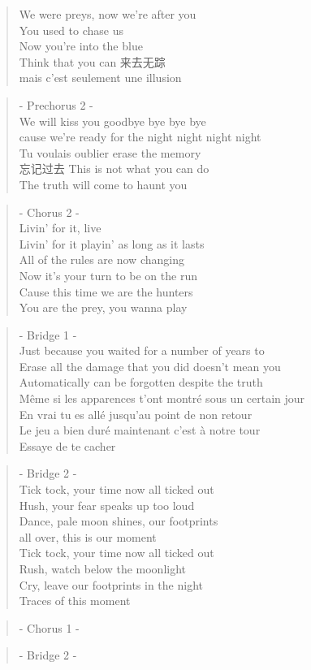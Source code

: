 \begin{verse}
We were preys, now we're after you\\
You used to chase us\\
Now you're into the blue\\
Think that you can 来去无踪 \\
mais c'est seulement une illusion
\end{verse}

\begin{verse}
- Prechorus 2 -\\
We will kiss you goodbye bye bye bye\\
cause we're ready for the night night night night\\
Tu voulais oublier erase the memory\\
忘记过去 This is not what you can do\\
The truth will come to haunt you
\end{verse}

\begin{verse}
- Chorus 2 -\\
Livin' for it, live \\
Livin' for it playin' as long as it lasts\\
All of the rules are now changing\\
Now it's your turn to be on the run\\
Cause this time we are the hunters \\
You are the prey, you wanna play
\end{verse}

\begin{verse}
- Bridge 1 -\\
Just because you waited for a number of years to \\
Erase all the damage that you did doesn't mean you\\
Automatically can be forgotten despite the truth\\
Même si les apparences t'ont  montré sous un certain jour\\
En vrai tu es allé jusqu'au point de non retour \\
Le jeu a bien duré maintenant c'est à notre tour\\
Essaye de te cacher 
\end{verse}

\begin{verse}
- Bridge 2 -\\
Tick tock, your time now all ticked out\\
Hush, your fear speaks up too loud\\
Dance, pale moon shines, our footprints \\
all over, this is our moment\\ 
Tick tock, your time now all ticked out \\
Rush, watch below the moonlight \\
Cry, leave our footprints in the night \\
Traces of this moment
\end{verse}

\begin{verse}
- Chorus 1 -
\end{verse}

\begin{verse}
- Bridge 2 -
\end{verse}
\clearpage

